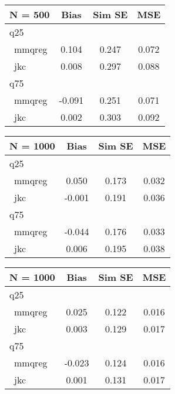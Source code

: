\documentclass[
  authoryear,
  review,
  1p]{elsarticle}
\begin{document}
\begin{table}

\caption{Bias, Simulated Standard Error, and MSE}\begin{minipage}[t]{0.50\linewidth}

{\centering 

\begin{longtable}[]{@{}lccc@{}}
\toprule\noalign{}
N = 500 & Bias & Sim SE & MSE \\
\midrule\noalign{}
\endhead
\bottomrule\noalign{}
\endlastfoot
q25 & & & \\
~mmqreg & 0.104 & 0.247 & 0.072 \\
~jkc & 0.008 & 0.297 & 0.088 \\
q75 & & & \\
~mmqreg & -0.091 & 0.251 & 0.071 \\
~jkc & 0.002 & 0.303 & 0.092 \\
\end{longtable}

}

\end{minipage}%
%
\begin{minipage}[t]{0.50\linewidth}

{\centering 

\begin{longtable}[]{@{}lccc@{}}
\toprule\noalign{}
N = 1000 & Bias & Sim SE & MSE \\
\midrule\noalign{}
\endhead
\bottomrule\noalign{}
\endlastfoot
q25 & & & \\
~mmqreg & 0.050 & 0.173 & 0.032 \\
~jkc & -0.001 & 0.191 & 0.036 \\
q75 & & & \\
~mmqreg & -0.044 & 0.176 & 0.033 \\
~jkc & 0.006 & 0.195 & 0.038 \\
\end{longtable}

}

\end{minipage}%
\newline
\begin{minipage}[t]{0.50\linewidth}

{\centering 

\begin{longtable}[]{@{}lccc@{}}
\toprule\noalign{}
N = 1000 & Bias & Sim SE & MSE \\
\midrule\noalign{}
\endhead
\bottomrule\noalign{}
\endlastfoot
q25 & & & \\
~mmqreg & 0.025 & 0.122 & 0.016 \\
~jkc & 0.003 & 0.129 & 0.017 \\
q75 & & & \\
~mmqreg & -0.023 & 0.124 & 0.016 \\
~jkc & 0.001 & 0.131 & 0.017 \\
\end{longtable}

}
\end{minipage}
\end{table}
\end{document}
